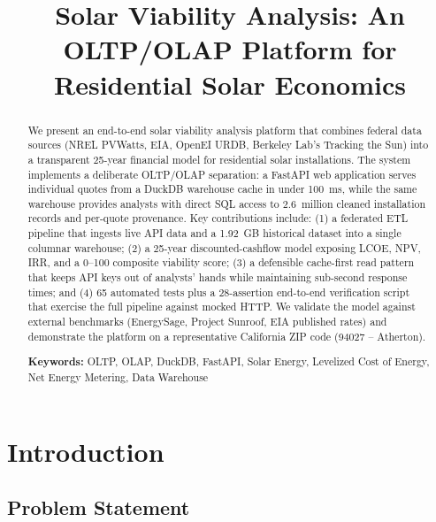 \documentclass[10pt, conference]{IEEEtran}
\begin{document}
\title{Solar Viability Analysis: An OLTP/OLAP Platform for Residential Solar Economics}

\author{
}

\maketitle

\begin{abstract}
We present an end-to-end solar viability analysis platform that combines federal data sources (NREL PVWatts, EIA, OpenEI URDB, Berkeley Lab's Tracking the Sun) into a transparent 25-year financial model for residential solar installations. The system implements a deliberate OLTP/OLAP separation: a FastAPI web application serves individual quotes from a DuckDB warehouse cache in under 100~ms, while the same warehouse provides analysts with direct SQL access to 2.6~million cleaned installation records and per-quote provenance. Key contributions include: (1) a federated ETL pipeline that ingests live API data and a 1.92~GB historical dataset into a single columnar warehouse; (2) a 25-year discounted-cashflow model exposing LCOE, NPV, IRR, and a 0--100 composite viability score; (3) a defensible cache-first read pattern that keeps API keys out of analysts' hands while maintaining sub-second response times; and (4) 65 automated tests plus a 28-assertion end-to-end verification script that exercise the full pipeline against mocked HTTP. We validate the model against external benchmarks (EnergySage, Project Sunroof, EIA published rates) and demonstrate the platform on a representative California ZIP code (94027 -- Atherton).

\textbf{Keywords:} OLTP, OLAP, DuckDB, FastAPI, Solar Energy, Levelized Cost of Energy, Net Energy Metering, Data Warehouse
\end{abstract}

\IEEEpeerreviewmaketitle

\section{Introduction}

\subsection{Problem Statement}
\end{document}
